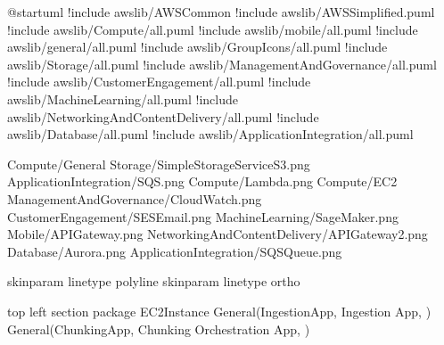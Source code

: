\documentclass[letterpaper,10pt,english]{sphinxmanual}
\begin{document}
\begin{figure}[htbp]
\centering

\end{figure}

\begin{sphinxVerbatim}[commandchars=\\\{\},numbers=left,firstnumber=1,stepnumber=1]
@startuml
!include \PYGZlt{}awslib/AWSCommon\PYGZgt{}
!include \PYGZlt{}awslib/AWSSimplified.puml\PYGZgt{}
!include \PYGZlt{}awslib/Compute/all.puml\PYGZgt{}
!include \PYGZlt{}awslib/mobile/all.puml\PYGZgt{}
!include \PYGZlt{}awslib/general/all.puml\PYGZgt{}
!include \PYGZlt{}awslib/GroupIcons/all.puml\PYGZgt{}
!include \PYGZlt{}awslib/Storage/all.puml\PYGZgt{}
!include \PYGZlt{}awslib/ManagementAndGovernance/all.puml\PYGZgt{}
!include \PYGZlt{}awslib/CustomerEngagement/all.puml\PYGZgt{}
!include \PYGZlt{}awslib/MachineLearning/all.puml\PYGZgt{}
!include \PYGZlt{}awslib/NetworkingAndContentDelivery/all.puml\PYGZgt{}
!include \PYGZlt{}awslib/Database/all.puml\PYGZgt{}
!include \PYGZlt{}awslib/ApplicationIntegration/all.puml\PYGZgt{}





\PYGZsq{}Compute/General
\PYGZsq{}Storage/SimpleStorageServiceS3.png
\PYGZsq{}ApplicationIntegration/SQS.png
\PYGZsq{}Compute/Lambda.png
\PYGZsq{}Compute/EC2
\PYGZsq{}ManagementAndGovernance/CloudWatch.png
\PYGZsq{}CustomerEngagement/SESEmail.png
\PYGZsq{}MachineLearning/SageMaker.png
\PYGZsq{}\PYGZsq{}Mobile/APIGateway.png
\PYGZsq{}NetworkingAndContentDelivery/APIGateway2.png
\PYGZsq{}Database/Aurora.png
\PYGZsq{}ApplicationIntegration/SQSQueue.png


skinparam linetype polyline
\PYGZsq{} skinparam linetype ortho

\PYGZsq{}top left section 
\PYGZsq{}\PYGZhy{}\PYGZhy{}\PYGZhy{}\PYGZhy{}\PYGZhy{}\PYGZhy{}\PYGZhy{}\PYGZhy{}\PYGZhy{}\PYGZhy{}\PYGZhy{}\PYGZhy{}\PYGZhy{}\PYGZhy{}\PYGZhy{}\PYGZhy{}\PYGZhy{}\PYGZhy{}\PYGZhy{}\PYGZhy{}\PYGZhy{}\PYGZhy{}\PYGZhy{}\PYGZhy{}\PYGZhy{}\PYGZhy{}\PYGZhy{}\PYGZhy{}\PYGZhy{}\PYGZhy{}\PYGZhy{}\PYGZhy{}\PYGZhy{}\PYGZhy{}\PYGZhy{}\PYGZhy{}\PYGZhy{}\PYGZhy{}\PYGZhy{}\PYGZhy{}\PYGZhy{}\PYGZhy{}\PYGZhy{}\PYGZhy{}\PYGZhy{}\PYGZhy{}\PYGZhy{}\PYGZhy{}\PYGZhy{}\PYGZhy{}\PYGZhy{}\PYGZhy{}\PYGZhy{}\PYGZhy{}\PYGZhy{}\PYGZhy{}\PYGZhy{}\PYGZhy{}\PYGZhy{}\PYGZhy{}\PYGZhy{}
package EC2\PYGZus{}Instance \PYGZob{}
General(IngestionApp, \PYGZdq{}Ingestion App\PYGZdq{}, \PYGZdq{} \PYGZdq{})
General(ChunkingApp, \PYGZdq{}Chunking Orchestration App\PYGZdq{}, \PYGZdq{} \PYGZdq{})
\PYGZcb{}


\end{sphinxVerbatim}
\end{document}
